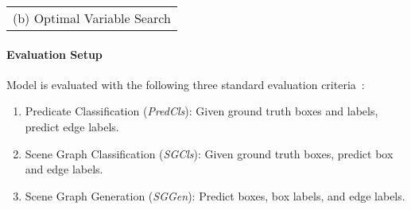 \begin{table*}[t!]
\begin{minipage}[t]{0.32\linewidth}
                \centering
                \begin{tabular}{@{}c@{}}
                    \textrm{(b) Optimal Variable Search}
                \end{tabular}
            \end{minipage}
            \label{tab:ablation}
        \end{table*}
        
        \paragraph{Evaluation Setup}
            Model is evaluated with the following three standard evaluation criteria~\cite{xu2017scene}:
            \begin{enumerate}
            \item Predicate Classification (\textit{PredCls}): Given ground truth boxes and labels, predict edge labels.
            \item Scene Graph Classification (\textit{SGCls}): Given ground truth boxes, predict box and edge labels.
            \item Scene Graph Generation (\textit{SGGen}): Predict boxes, box labels, and edge labels.
            \end{enumerate}
            
